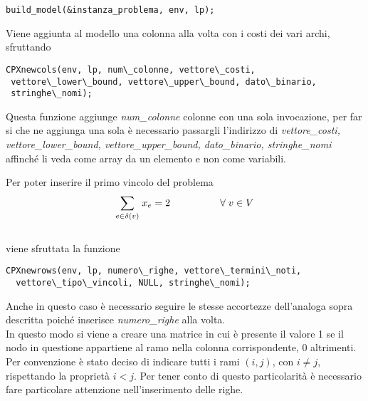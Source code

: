 \begin{lstlisting}[basicstyle=\footnotesize\sffamily,]     
build_model(&instanza_problema, env, lp);
\end{lstlisting}

Viene aggiunta al modello una colonna alla volta con i costi dei vari archi, sfruttando \\

\begin{lstlisting}[basicstyle=\footnotesize\sffamily,]     
CPXnewcols(env, lp, num\_colonne, vettore\_costi,
 vettore\_lower\_bound, vettore\_upper\_bound, dato\_binario, 
 stringhe\_nomi);
\end{lstlisting}

Questa funzione aggiunge \textit{num\_colonne} colonne con una sola invocazione, per far si che ne aggiunga una sola è necessario passargli l'indirizzo di \textit{vettore\_costi, vettore\_lower\_bound, vettore\_upper\_bound, dato\_binario, stringhe\_nomi} affinché li veda come array da un elemento e non come variabili.

Per poter inserire il primo vincolo del problema\\

$$
\underset{e\in \delta(v)}\sum{\;x_e} = 2\;\;\;\;\;\;\;\;\;\;\;\;\;\;\;\;\;\;\forall\;v\in V \\\\
$$
\\
viene sfruttata la funzione \\

\begin{lstlisting}[basicstyle=\footnotesize\sffamily,]     
 CPXnewrows(env, lp, numero\_righe, vettore\_termini\_noti,
  vettore\_tipo\_vincoli, NULL, stringhe\_nomi);
\end{lstlisting}

Anche in questo caso è necessario seguire le stesse accortezze dell'analoga sopra descritta poiché inserisce \textit{numero\_righe} alla volta.\\
In questo modo si viene a creare una matrice in cui è presente il valore 1 se il nodo in questione appartiene al ramo nella colonna corrispondente, 0 altrimenti.\\
Per convenzione è stato deciso di indicare tutti i rami $(i,j)$, con $i\neq j$, rispettando la proprietà $i<j$. Per tener conto di questo particolarità è necessario fare particolare attenzione nell'inserimento delle righe.





